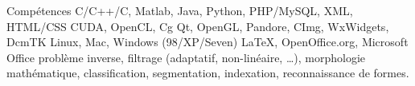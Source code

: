 
\begin{rubric}{Compétences}
   \entry*[Langages] C/C++/C, Matlab, Java, Python, PHP/MySQL, XML, HTML/CSS
     CUDA, OpenCL, Cg
   \entry*[Bibliothèques]  Qt, OpenGL, Pandore, CImg, WxWidgets, DcmTK
   \entry*[Systèmes]  Linux, Mac, Windows (98/XP/Seven)
   \entry*[Bureautique]  \LaTeX{}, OpenOffice.org, Microsoft Office  
   problème inverse, filtrage (adaptatif, non-linéaire, \ldots), morphologie mathématique, classification, segmentation, indexation, reconnaissance de formes.
\end{rubric}

